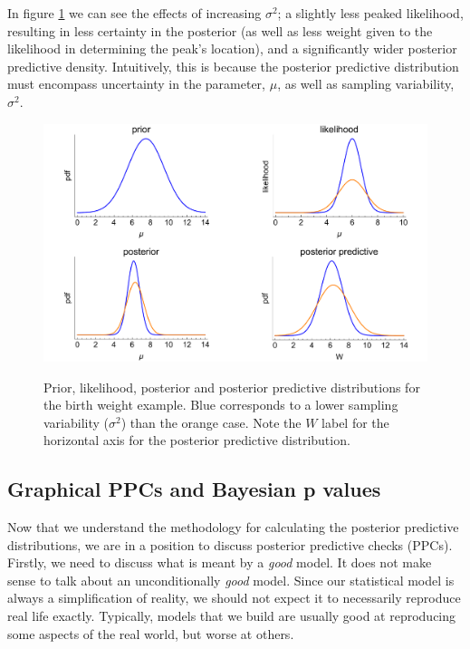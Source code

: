 \documentclass[11pt,fullpage]{book}
\begin{document}
In figure \ref{fig:Evaluation_normalPosteriorPredictiveWeight} we can see the effects of increasing $\sigma^2$; a slightly less peaked likelihood, resulting in less certainty in the posterior (as well as less weight given to the likelihood in determining the peak's location), and a significantly wider posterior predictive density. Intuitively, this is because the posterior predictive distribution must encompass uncertainty in the parameter, $\mu$, as well as sampling variability, $\sigma^2$. 

\begin{figure}
\centering
\scalebox{0.5} 
{\includegraphics{Evaluation_normalPosteriorPredictiveWeight.pdf}}
\caption{Prior, likelihood, posterior and posterior predictive distributions for the birth weight example. Blue corresponds to a lower sampling variability ($\sigma^2$) than the orange case. Note the $W$ label for the horizontal axis for the posterior predictive distribution.}\label{fig:Evaluation_normalPosteriorPredictiveWeight}
\end{figure}

\subsection{Graphical PPCs and Bayesian p values}
Now that we understand the methodology for calculating the posterior predictive distributions, we are in a position to discuss posterior predictive checks (PPCs). Firstly, we need to discuss what is meant by a \textit{good} model. It does not make sense to talk about an unconditionally \textit{good} model. Since our statistical model is always a simplification of reality, we should not expect it to necessarily reproduce real life exactly. Typically, models that we build are usually good at reproducing some aspects of the real world, but worse at others.
\end{document}

